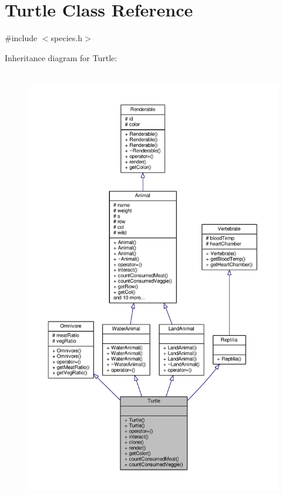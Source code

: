 \hypertarget{classTurtle}{}\section{Turtle Class Reference}
\label{classTurtle}


{\ttfamily \#include $<$species.\+h$>$}



Inheritance diagram for Turtle\+:
\nopagebreak
\begin{figure}[H]
\begin{center}
\leavevmode
\includegraphics[height=550pt]{classTurtle__inherit__graph}
\end{center}
\end{figure}



